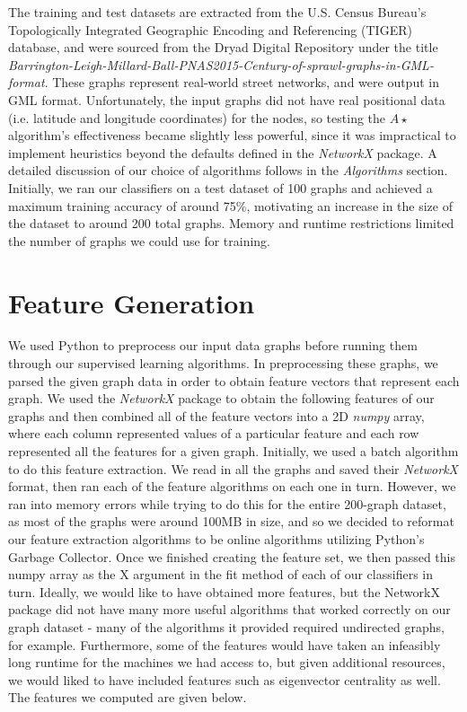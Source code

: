 \documentclass{article}
\begin{document}
The training and test datasets are extracted from the U.S. Census Bureau's Topologically Integrated Geographic Encoding and Referencing (TIGER) database, and were sourced from the Dryad Digital Repository under the title \textit{Barrington-Leigh-Millard-Ball-PNAS2015-Century-of-sprawl-graphs-in-GML-format}. These graphs represent real-world street networks, and were output in GML format. Unfortunately, the input graphs did not have real positional data (i.e. latitude and longitude coordinates) for the nodes, so testing the $A\star$ algorithm's effectiveness became slightly less powerful, since it was impractical to implement heuristics beyond the defaults defined in the \textit{NetworkX} package. A detailed discussion of our choice of algorithms follows in the \textit{Algorithms} section. Initially, we ran our classifiers on a test dataset of 100 graphs and achieved a maximum training accuracy of around 75$\%$, motivating an increase in the size of the dataset to around 200 total graphs. Memory and runtime restrictions limited the number of graphs we could use for training.

\section{Feature Generation}

We used Python to preprocess our input data graphs before running them through our supervised learning algorithms. In preprocessing these graphs, we parsed the given graph data in order to obtain feature vectors that represent each graph. We used the \textit{NetworkX} package to obtain the following features of our graphs and then combined all of the feature vectors into a 2D \textit{numpy} array, where each column represented values of a particular feature and each row represented all the features for a given graph. Initially, we used a batch algorithm to do this feature extraction. We read in all the graphs and saved their \textit{NetworkX} format, then ran each of the feature algorithms on each one in turn. However, we ran into memory errors while trying to do this for the entire 200-graph dataset, as most of the graphs were around 100MB in size, and so we decided to reformat our feature extraction algorithms to be online algorithms utilizing Python's Garbage Collector. Once we finished creating the feature set, we then passed this numpy array as the X argument in the fit method of each of our classifiers in turn. Ideally, we would like to have obtained more features, but the NetworkX package did not have many more useful algorithms that worked correctly on our graph dataset - many of the algorithms it provided required undirected graphs, for example. Furthermore, some of the features would have taken an infeasibly long runtime for the machines we had access to, but given additional resources, we would liked to have included features such as eigenvector centrality as well. The features we computed are given below.
\end{document}
